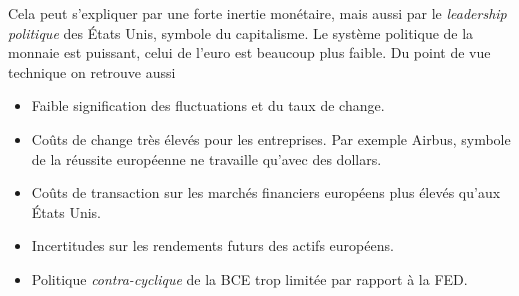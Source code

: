 \documentclass[main.tex]{subfiles}
\begin{document}
        \bigskip

        Cela peut s'expliquer par une forte inertie monétaire, mais aussi par le \emph{leadership politique} des États Unis, symbole du capitalisme. Le système politique de la monnaie est puissant, celui de l'euro est beaucoup plus faible. Du point de vue technique on retrouve aussi
        \begin{itemize}
                \item Faible signification des fluctuations et du taux de change.
                \item Coûts de change très élevés pour les entreprises. Par exemple Airbus, symbole de la réussite européenne ne travaille qu'avec des dollars.
                \item Coûts de transaction sur les marchés financiers européens plus élevés qu'aux États Unis.
                \item Incertitudes sur les rendements futurs des actifs européens.
                \item Politique \emph{contra-cyclique} de la BCE trop limitée par rapport à la FED.
        \end{itemize}
\end{document}
